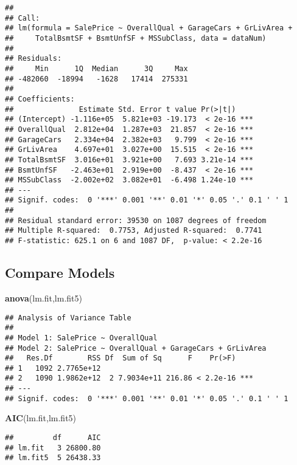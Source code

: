 \documentclass[]{article}
\newenvironment{Shaded}{\begin{snugshade}}{\end{snugshade}}
\newcommand{\KeywordTok}[1]{\textcolor[rgb]{0.13,0.29,0.53}{\textbf{#1}}}
\newcommand{\NormalTok}[1]{#1}
\begin{document}
\begin{verbatim}
## 
## Call:
## lm(formula = SalePrice ~ OverallQual + GarageCars + GrLivArea + 
##     TotalBsmtSF + BsmtUnfSF + MSSubClass, data = dataNum)
## 
## Residuals:
##     Min      1Q  Median      3Q     Max 
## -482060  -18994   -1628   17414  275331 
## 
## Coefficients:
##               Estimate Std. Error t value Pr(>|t|)    
## (Intercept) -1.116e+05  5.821e+03 -19.173  < 2e-16 ***
## OverallQual  2.812e+04  1.287e+03  21.857  < 2e-16 ***
## GarageCars   2.334e+04  2.382e+03   9.799  < 2e-16 ***
## GrLivArea    4.697e+01  3.027e+00  15.515  < 2e-16 ***
## TotalBsmtSF  3.016e+01  3.921e+00   7.693 3.21e-14 ***
## BsmtUnfSF   -2.463e+01  2.919e+00  -8.437  < 2e-16 ***
## MSSubClass  -2.002e+02  3.082e+01  -6.498 1.24e-10 ***
## ---
## Signif. codes:  0 '***' 0.001 '**' 0.01 '*' 0.05 '.' 0.1 ' ' 1
## 
## Residual standard error: 39530 on 1087 degrees of freedom
## Multiple R-squared:  0.7753, Adjusted R-squared:  0.7741 
## F-statistic: 625.1 on 6 and 1087 DF,  p-value: < 2.2e-16
\end{verbatim}

\subsection{Compare Models}\label{compare-models}

\begin{Shaded}
\begin{Highlighting}[]
\KeywordTok{anova}\NormalTok{(lm.fit,lm.fit5)}
\end{Highlighting}
\end{Shaded}

\begin{verbatim}
## Analysis of Variance Table
## 
## Model 1: SalePrice ~ OverallQual
## Model 2: SalePrice ~ OverallQual + GarageCars + GrLivArea
##   Res.Df        RSS Df  Sum of Sq      F    Pr(>F)    
## 1   1092 2.7765e+12                                   
## 2   1090 1.9862e+12  2 7.9034e+11 216.86 < 2.2e-16 ***
## ---
## Signif. codes:  0 '***' 0.001 '**' 0.01 '*' 0.05 '.' 0.1 ' ' 1
\end{verbatim}

\begin{Shaded}
\begin{Highlighting}[]
\KeywordTok{AIC}\NormalTok{(lm.fit,lm.fit5)}
\end{Highlighting}
\end{Shaded}

\begin{verbatim}
##         df      AIC
## lm.fit   3 26800.80
## lm.fit5  5 26438.33
\end{verbatim}
\end{document}

